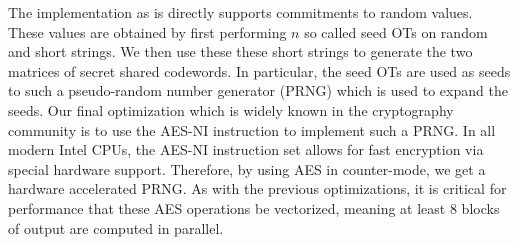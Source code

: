The implementation as is directly supports commitments to random values. These values are obtained by first performing $n$ so called seed OTs on random and short strings. We then use these these short strings to generate the two matrices of secret shared codewords. In particular, the seed OTs are used as seeds to such a pseudo-random number generator (PRNG) which is used to expand the seeds. Our final optimization which is widely known in the cryptography community is to use the AES-NI instruction to implement such a PRNG. In all modern Intel CPUs, the AES-NI instruction set allows for fast encryption via special hardware support. Therefore, by using AES in counter-mode, we get a hardware accelerated PRNG. As with the previous optimizations, it is critical for performance that these AES operations be vectorized, meaning at least 8 blocks of output are computed in parallel.


